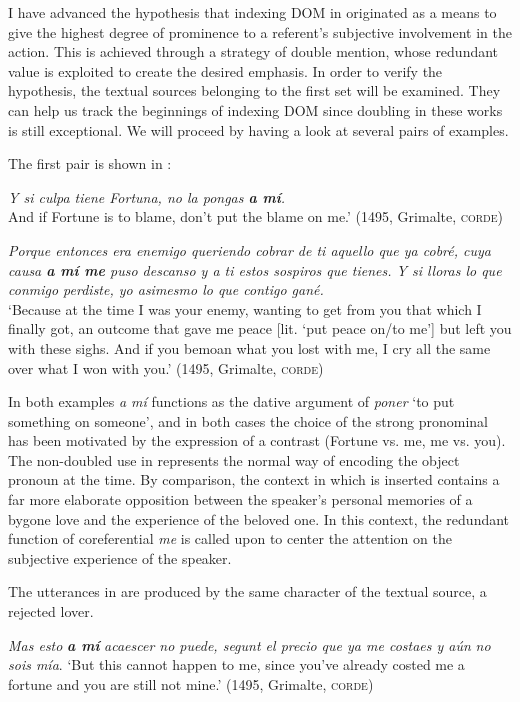 \documentclass[output=paper]{LSP/langsci}
\begin{document}
I have advanced the hypothesis that indexing DOM in  originated as a means to give the highest degree of prominence to a referent’s subjective involvement in the action. This is achieved through a strategy of double mention, whose redundant value is exploited to create the desired emphasis. In order to verify the hypothesis, the textual sources belonging to the first set will be examined. They can help us track the beginnings of indexing DOM since doubling in these works is still exceptional. We will proceed by having a look at several pairs of examples.

The first pair is shown in :

\ea \label{04-me-ex:14}
\ea \label{04-me-ex:14a}
\textit{Y si culpa tiene Fortuna, no la pongas \textbf{a mí}.}\\
\glt And if Fortune is to blame, don’t put the blame on me.’ (1495, Grimalte, \textsc{corde})

\ex \label{04-me-ex:14b}
\textit{Porque entonces era enemigo queriendo cobrar de ti aquello que ya cobré, cuya causa \textbf{a mí me} puso descanso y a ti estos sospiros que tienes. Y si lloras lo que conmigo perdiste, yo asimesmo lo que contigo gané.}\\
\glt ‘Because at the time I was your enemy, wanting to get from you that which I finally got, an outcome that gave me peace [lit. ‘put peace on/to me’] but left you with these sighs. And if you bemoan what you lost with me, I cry all the same over what I won with you.’ (1495, Grimalte, \textsc{corde})
\z
\z

In both examples \textit{a mí} functions as the dative argument of \textit{poner} ‘to put something on someone’, and in both cases the choice of the strong pronominal has been motivated by the expression of a contrast (Fortune vs. me, me vs. you). The non-doubled use in  represents the normal way of encoding the object pronoun at the time. By comparison, the context in which  is inserted contains a far more elaborate opposition between the speaker’s personal memories of a bygone love and the experience of the beloved one. In this context, the redundant function of coreferential \textit{me} is called upon to center the attention on the subjective experience of the speaker. 

\largerpage
 The utterances in  are produced by the same character of the textual source, a rejected lover. 

\ea \label{04-me-ex:15}
\ea \label{04-me-ex:15a}
\textit{Mas esto} \textbf{\textit{a mí}} \textit{acaescer no puede, segunt el precio que ya me costaes y aún} \textit{no sois mía}.
\glt ‘But this cannot happen to me, since you’ve already costed me a fortune and you are still not mine.’ (1495, Grimalte, \textsc{corde})
\end{document}
